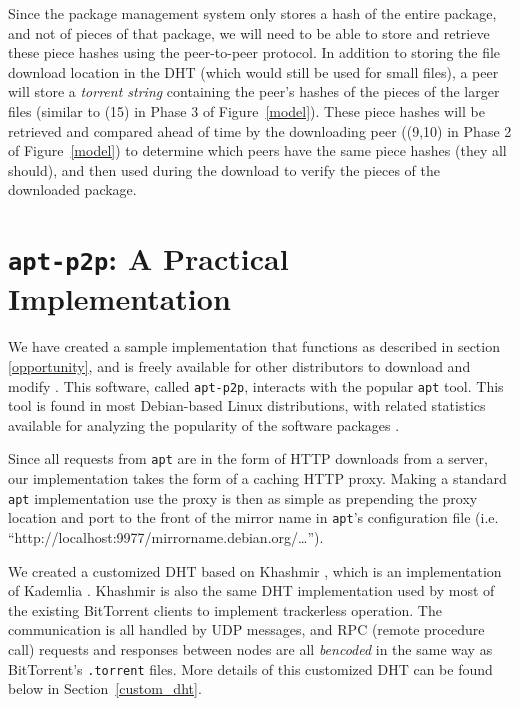 \documentclass[conference]{IEEEtran}
\begin{document}
Since the package management system only stores a hash of the entire
package, and not of pieces of that package, we will need to be able
to store and retrieve these piece hashes using the peer-to-peer protocol. In
addition to storing the file download location in the DHT (which
would still be used for small files), a peer will store a
\emph{torrent string} containing the peer's hashes of the pieces of
the larger files (similar to (15) in Phase 3 of Figure~\ref{model}).
These piece hashes will be retrieved and compared ahead of time by
the downloading peer ((9,10) in Phase 2 of Figure~\ref{model})
to determine which peers have the same piece hashes (they all
should), and then used during the download to verify the pieces of
the downloaded package.


\section{\texttt{apt-p2p}: A Practical Implementation}
\label{implementation}

We have created a sample implementation that functions as described
in section \ref{opportunity}, and is freely available for other
distributors to download and modify \cite{apt-p2p}. This software,
called \texttt{apt-p2p}, interacts with the popular \texttt{apt} tool. This tool
is found in most Debian-based Linux distributions, with related statistics
available for analyzing the popularity of the software packages
\cite{popcon}.

Since all requests from \texttt{apt} are in the form of HTTP downloads from a
server, our implementation takes the form of a caching HTTP proxy.
Making a standard \texttt{apt} implementation use the proxy is then
as simple as prepending the proxy location and port to the front of
the mirror name in \texttt{apt}'s configuration file (i.e.
``http://localhost:9977/mirrorname.debian.org/\ldots'').

We created a customized DHT based on Khashmir \cite{khashmir}, which
is an implementation of Kademlia \cite{kademlia}. Khashmir is also the same DHT
implementation used by most of the existing BitTorrent clients to
implement trackerless operation. The communication is all handled by
UDP messages, and RPC (remote procedure call) requests and responses between nodes
are all \emph{bencoded} in the same way as BitTorrent's
\texttt{.torrent} files.
More details of this customized DHT can be found below in
Section~\ref{custom_dht}.
\end{document}

